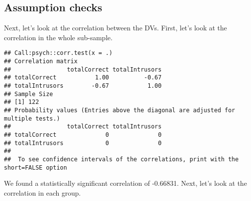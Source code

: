 \documentclass[12pt,]{article}
\newenvironment{Shaded}{\begin{snugshade}}{\end{snugshade}}
\newcommand{\DataTypeTok}[1]{\textcolor[rgb]{0.13,0.29,0.53}{#1}}
\newcommand{\KeywordTok}[1]{\textcolor[rgb]{0.13,0.29,0.53}{\textbf{#1}}}
\newcommand{\NormalTok}[1]{#1}
\newcommand{\OperatorTok}[1]{\textcolor[rgb]{0.81,0.36,0.00}{\textbf{#1}}}
\newcommand{\StringTok}[1]{\textcolor[rgb]{0.31,0.60,0.02}{#1}}
\begin{document}
\hypertarget{assumption-checks}{%
\subsection{Assumption checks}\label{assumption-checks}}

Next, let's look at the correlation between the DVs. First, let's look
at the correlation in the whole sub-sample.

\begin{Shaded}
\end{Shaded}

\begin{verbatim}
## Call:psych::corr.test(x = .)
## Correlation matrix 
##                totalCorrect totalIntrusors
## totalCorrect           1.00          -0.67
## totalIntrusors        -0.67           1.00
## Sample Size 
## [1] 122
## Probability values (Entries above the diagonal are adjusted for multiple tests.) 
##                totalCorrect totalIntrusors
## totalCorrect              0              0
## totalIntrusors            0              0
## 
##  To see confidence intervals of the correlations, print with the short=FALSE option
\end{verbatim}

We found a statistically significant correlation of -0.66831. Next,
let's look at the correlation in each group.

\begin{Shaded}
\end{Shaded}
\end{document}
